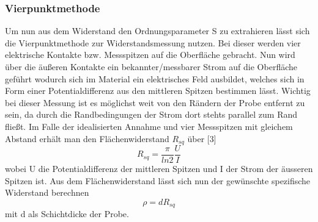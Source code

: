         \subsubsection{Vierpunktmethode}   
            Um nun aus dem Widerstand den Ordnungsparameter S zu extrahieren lässt sich die Vierpunktmethode
            zur Widerstandsmessung nutzen. Bei dieser werden vier elektrische Kontakte bzw. Messspitzen auf die 
            Oberfläche gebracht. Nun wird über die äußeren Kontakte ein bekannter/messbarer Strom auf die Oberfläche
            geführt wodurch sich im Material ein elektrisches Feld ausbildet, welches sich in Form einer 
            Potentialdifferenz aus den mittleren Spitzen bestimmen lässt.
            Wichtig bei dieser Messung ist es möglichst weit von den Rändern der Probe entfernt zu sein, da durch die Randbedingungen der
            Strom dort stehts parallel zum Rand fließt. Im Falle der idealisierten Annahme und vier Messspitzen 
            mit gleichem Abstand erhält man den Flächenwiderstand $R_{sq}$ über [3]
            \begin{equation}
                R_{sq} = \frac{\pi}{ln2}\frac{U}{I}
            \end{equation}
            wobei U die Potentialdifferenz der mittleren Spitzen und I der Strom der äusseren Spitzen ist.
            Aus dem Flächenwiderstand lässt sich nun der gewünschte spezifische Widerstand berechnen
            \begin{equation}
                \rho = d R_{sq}
            \end{equation}
            mit d als Schichtdicke der Probe.

